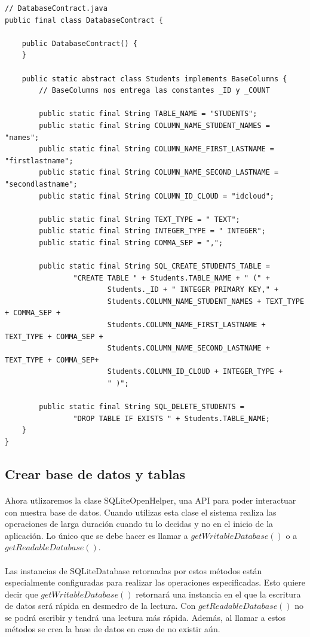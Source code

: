 \documentclass[10pt]{extarticle}
\begin{document}
\begin{lstlisting}
// DatabaseContract.java
public final class DatabaseContract {

    public DatabaseContract() {
    }

    public static abstract class Students implements BaseColumns {
		// BaseColumns nos entrega las constantes _ID y _COUNT
		
        public static final String TABLE_NAME = "STUDENTS";
        public static final String COLUMN_NAME_STUDENT_NAMES = "names";
        public static final String COLUMN_NAME_FIRST_LASTNAME = "firstlastname";
        public static final String COLUMN_NAME_SECOND_LASTNAME = "secondlastname";
        public static final String COLUMN_ID_CLOUD = "idcloud";

        public static final String TEXT_TYPE = " TEXT";
        public static final String INTEGER_TYPE = " INTEGER";
        public static final String COMMA_SEP = ",";

        public static final String SQL_CREATE_STUDENTS_TABLE =
                "CREATE TABLE " + Students.TABLE_NAME + " (" +
                        Students._ID + " INTEGER PRIMARY KEY," +
                        Students.COLUMN_NAME_STUDENT_NAMES + TEXT_TYPE + COMMA_SEP +
                        Students.COLUMN_NAME_FIRST_LASTNAME + TEXT_TYPE + COMMA_SEP +
                        Students.COLUMN_NAME_SECOND_LASTNAME + TEXT_TYPE + COMMA_SEP+
                        Students.COLUMN_ID_CLOUD + INTEGER_TYPE +
                        " )";

        public static final String SQL_DELETE_STUDENTS =
                "DROP TABLE IF EXISTS " + Students.TABLE_NAME;
    }
}
\end{lstlisting}

\subsection{Crear base de datos y tablas}

\paragraph{}
Ahora utlizaremos la clase SQLiteOpenHelper, una API para poder interactuar con nuestra base de datos. Cuando utilizas esta clase el sistema realiza las operaciones de larga duración cuando tu lo decidas y no en el inicio de la aplicación. Lo único que se debe hacer es llamar a $getWritableDatabase()$ o a $getReadableDatabase()$. 
\paragraph{}
Las instancias de SQLiteDatabase retornadas por estos métodos están especialmente configuradas para realizar las operaciones especificadas. Esto quiere decir que $getWritableDatabase()$ retornará una instancia en el que la escritura de datos será rápida en desmedro de la lectura. Con $getReadableDatabase()$ no se podrá escribir y tendrá una lectura más rápida. Además, al llamar a estos métodos se crea la base de datos en caso de no existir aún.
\end{document}
